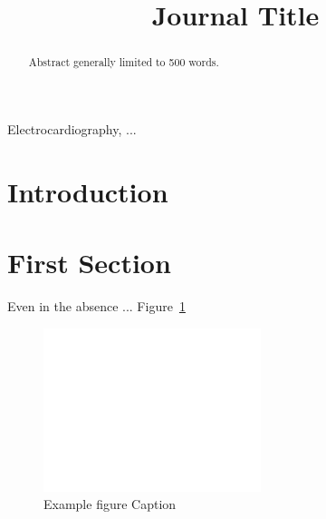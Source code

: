 \documentclass[journal]{../templates/IEEEtran}
\begin{document}
\title{Journal Title}

\maketitle

\begin{abstract}
Abstract generally limited to 500 words.
\end{abstract}

\begin{IEEEkeywords} %
Electrocardiography, ...
\end{IEEEkeywords}

\section{Introduction} 

\section{First Section}

Even in the absence ... Figure~\ref{myfig}

\begin{figure}[!b] %
	\centering
	\includegraphics[width=2.5in,draft]{temp}
	\caption{Example figure Caption}
	\label{myfig}
\end{figure}
\end{document}
